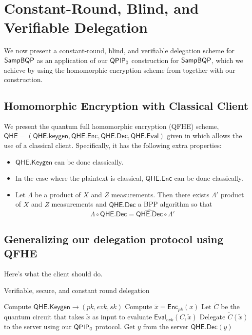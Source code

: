 \section{Constant-Round, Blind, and Verifiable Delegation}


We now present a constant-round, blind, and verifiable delegation scheme for $\operatorname{\mathsf{SampBQP}}$ as an application of our $\operatorname{\mathsf{QPIP}}_0$ construction for $\operatorname{\mathsf{SampBQP}}$,
which we achieve by using the homomorphic encryption scheme from \cite{mahadev_qfhe} together with our construction.

\subsection{Homomorphic Encryption with Classical Client}


We present the quantum full homomorphic encryption (QFHE) scheme, $\mathsf{QHE}=(\mathsf{QHE.keygen}, \mathsf{QHE.Enc}, \mathsf{QHE.Dec}, \mathsf{QHE.Eval})$ given in \cite{mahadev_qfhe} which allows the use of a classical client. Specifically, it has the following extra properties:
\begin{itemize}
	\item $\mathsf{QHE.Keygen}$ can be done classically.
	\item In the case where the plaintext is classical, $\mathsf{QHE.Enc}$ can be done classically.
	\item Let $\Lambda$ be a product of $X$ and $Z$ measurements. Then there exists $\Lambda'$ product of $X$ and $Z$ measurements and $\widehat{\mathsf{QHE.Dec}}$ a BPP algorithm so that
		$$\Lambda\circ\mathsf{QHE.Dec}=\widehat{\mathsf{QHE.Dec}}\circ\Lambda'$$
\end{itemize}

\subsection{Generalizing our delegation protocol using QFHE}


Here's what the client should do.

\begin{algorithm}
	\caption{Verifiable, secure, and constant round delegation}
	\label{ProtoPrivateDelegation}
	\begin{algorithmic}[1]
			\State Compute $\mathsf{QHE.Keygen}\rightarrow(pk, evk, sk)$
			\State Compute $\tilde{x}=\mathsf{Enc}_{pk}(x)$
			\State Let $\tilde{C}$ be the quantum circuit that takes $\tilde{x}$ as input to evaluate $\mathsf{Eval}_{evk}(C, \tilde{x})$
			\State Delegate $\tilde{C}(\tilde{x})$ to the server using our $\operatorname{\mathsf{QPIP}}_0$ protocol.
			\State Get $y$ from the server
			\State \Return $\mathsf{QHE.Dec}(y)$
		\EndProcedure
	\end{algorithmic}
\end{algorithm}

